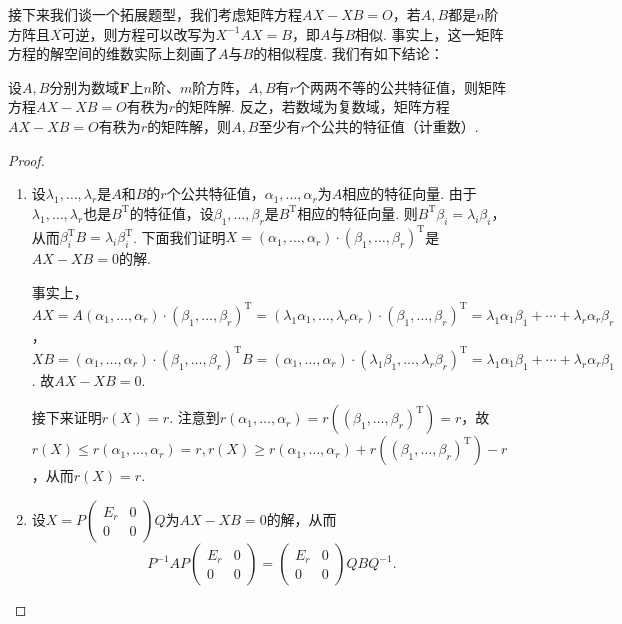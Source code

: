 接下来我们谈一个拓展题型，我们考虑矩阵方程$AX-XB=O$，若$A,B$都是$n$阶方阵且$X$可逆，则方程可以改写为$X^{-1}AX=B$，即$A$与$B$相似. 事实上，这一矩阵方程的解空间的维数实际上刻画了$A$与$B$的相似程度. 我们有如下结论：
\begin{theorem}{}{}
    设$A,B$分别为数域$\mathbf{F}$上$n$阶、$m$阶方阵，$A,B$有$r$个两两不等的公共特征值，则矩阵方程$AX-XB=O$有秩为$r$的矩阵解. 反之，若数域为复数域，矩阵方程$AX-XB=O$有秩为$r$的矩阵解，则$A,B$至少有$r$个公共的特征值（计重数）.
\end{theorem}

\begin{proof}
    \begin{enumerate}
        \item 设$\lambda_1,\ldots,\lambda_r$是$A$和$B$的$r$个公共特征值，$\alpha_1,\ldots,\alpha_r$为$A$相应的特征向量. 由于$\lambda_1,\ldots,\lambda_r$也是$B^\mathrm{T}$的特征值，设$\beta_1,\ldots,\beta_r$是$B^\mathrm{T}$相应的特征向量. 则$B^\mathrm{T}\beta_i=\lambda_i\beta_i$，从而$\beta_i^{\mathrm{T}}B=\lambda_i\beta_i^{\mathrm{T}}$. 下面我们证明$X=(\alpha_1,\ldots,\alpha_r)\cdot(\beta_1,\ldots,\beta_r)^\mathrm{T}$是$AX-XB=0$的解.

        事实上，$AX=A(\alpha_1,\ldots,\alpha_r)\cdot(\beta_1,\ldots,\beta_r)^\mathrm{T}=(\lambda_1\alpha_1,\ldots,\lambda_r\alpha_r)\cdot(\beta_1,\ldots,\beta_r)^\mathrm{T}=\lambda_1\alpha_1\beta_1+\cdots+\lambda_r\alpha_r\beta_r$，$XB=(\alpha_1,\ldots,\alpha_r)\cdot(\beta_1,\ldots,\beta_r)^\mathrm{T}B=(\alpha_1,\ldots,\alpha_r)\cdot(\lambda_1\beta_1,\ldots,\lambda_r\beta_r)^\mathrm{T}=\lambda_1\alpha_1\beta_1+\cdots+\lambda_r\alpha_r\beta_1$. 故$AX-XB=0$.

        接下来证明$r(X)=r$.
        注意到$r(\alpha_1,\ldots,\alpha_r)=r((\beta_1,\ldots,\beta_r)^\mathrm{T})=r$，故$r(X)\leqslant r(\alpha_1,\ldots,\alpha_r)=r,r(X)\geqslant r(\alpha_1,\ldots,\alpha_r)+r((\beta_1,\ldots,\beta_r)^\mathrm{T})-r$，从而$r(X)=r$.
        \item 设$X=P\begin{pmatrix}
            E_r & 0 \\
            0 & 0
        \end{pmatrix}Q$为$AX-XB=0$的解，从而
        \[P^{-1}AP\begin{pmatrix}
            E_r & 0 \\
            0 & 0
        \end{pmatrix} =
        \begin{pmatrix}
            E_r & 0 \\
            0 & 0
        \end{pmatrix}QBQ^{-1}.\]


\end{enumerate}
\end{proof}
